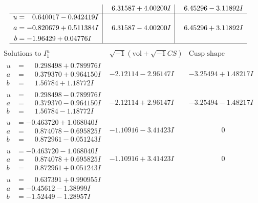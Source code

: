 \documentclass[1p]{elsarticle_modified}
\theoremstyle{definition}
\newcommand{\I}{\sqrt{-1}}
\begin{document}
$$\begin{array}{c|c|c}
 & \phantom{-}6.31587 + 4.00200 I & \phantom{-}6.45296 - 3.11892 I \\ \hline\begin{aligned}
u &= \phantom{-}0.640017 - 0.942419 I \\
a &= -0.820679 + 0.511384 I \\
b &= -1.96429 + 0.04776 I\end{aligned}
 & \phantom{-}6.31587 - 4.00200 I & \phantom{-}6.45296 + 3.11892 I\\
 \hline 
 \end{array}$$\newpage$$\begin{array}{c|c|c}  
\text{Solutions to }I^u_{1}& \I (\text{vol} + \sqrt{-1}CS) & \text{Cusp shape}\\
 \hline 
\begin{aligned}
u &= \phantom{-}0.298498 + 0.789976 I \\
a &= \phantom{-}0.379370 + 0.964150 I \\
b &= \phantom{-}1.56784 + 1.18772 I\end{aligned}
 & -2.12114 - 2.96147 I & -3.25494 + 1.48217 I \\ \hline\begin{aligned}
u &= \phantom{-}0.298498 - 0.789976 I \\
a &= \phantom{-}0.379370 - 0.964150 I \\
b &= \phantom{-}1.56784 - 1.18772 I\end{aligned}
 & -2.12114 + 2.96147 I & -3.25494 - 1.48217 I \\ \hline\begin{aligned}
u &= -0.463720 + 1.068040 I \\
a &= \phantom{-}0.874078 - 0.695825 I \\
b &= \phantom{-}0.872961 - 0.051243 I\end{aligned}
 & -1.10916 - 3.41423 I & \phantom{-0.000000 } 0 \\ \hline\begin{aligned}
u &= -0.463720 - 1.068040 I \\
a &= \phantom{-}0.874078 + 0.695825 I \\
b &= \phantom{-}0.872961 + 0.051243 I\end{aligned}
 & -1.10916 + 3.41423 I & \phantom{-0.000000 } 0 \\ \hline\begin{aligned}
u &= \phantom{-}0.637391 + 0.990955 I \\
a &= -0.45612 - 1.38999 I \\
b &= -1.52449 - 1.28957 I\end{aligned}

\end{array}$$
\end{document}
